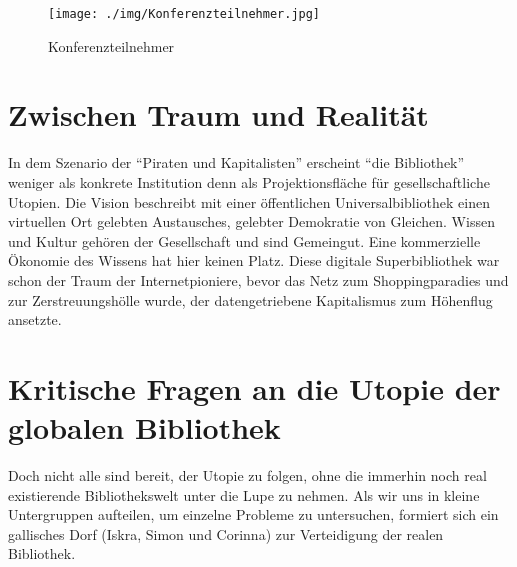 \documentclass[a4paper,
fontsize=11pt,
oneside,
numbers=noperiodatend,
parskip=half-,
bibliography=totoc,
final
]{scrartcl}
\begin{document}
\begin{figure}[htbp]
\centering
\texttt{[image: ./img/Konferenzteilnehmer.jpg]}
\caption{Konferenzteilnehmer}
\end{figure}

\section*{Zwischen Traum und
Realität}\label{zwischen-traum-und-realituxe4t}

In dem Szenario der \enquote{Piraten und Kapitalisten} erscheint
\enquote{die Bibliothek} weniger als konkrete Institution denn als
Projektionsfläche für gesellschaftliche Utopien. Die Vision beschreibt
mit einer öffentlichen Universalbibliothek einen virtuellen Ort gelebten
Austausches, gelebter Demokratie von Gleichen. Wissen und Kultur gehören
der Gesellschaft und sind Gemeingut. Eine kommerzielle Ökonomie des
Wissens hat hier keinen Platz. Diese digitale Superbibliothek war schon
der Traum der Internetpioniere, bevor das Netz zum Shoppingparadies und
zur Zerstreuungshölle wurde, der datengetriebene Kapitalismus zum
Höhenflug ansetzte.

\section*{Kritische Fragen an die Utopie der globalen
Bibliothek}\label{kritische-fragen-an-die-utopie-der-globalen-bibliothek}

Doch nicht alle sind bereit, der Utopie zu folgen, ohne die immerhin
noch real existierende Bibliothekswelt unter die Lupe zu nehmen. Als wir
uns in kleine Untergruppen aufteilen, um einzelne Probleme zu
untersuchen, formiert sich ein gallisches Dorf (Iskra, Simon und
Corinna) zur Verteidigung der realen Bibliothek.
\end{document}
